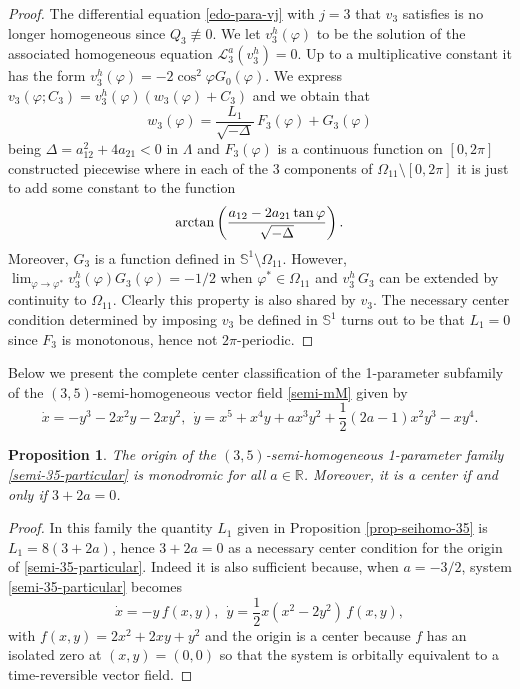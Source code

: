 \documentclass[12pt]{amsart}
\newtheorem {proposition} [theorem]{Proposition}
\begin{document}
\begin{proof}
The differential equation \eqref{edo-para-vj} with $j=3$ that $v_3$ satisfies is no longer homogeneous since $Q_3 \not\equiv 0$. We let $v_3^h(\varphi)$ to be the solution of the associated homogeneous equation $\mathcal{L}^{a}_3(v_3^h) = 0$. Up to a multiplicative constant it has the form $v_3^h(\varphi) = -2 \cos^2\varphi  G_0(\varphi)$. We express $v_3(\varphi; C_3) = v_3^h(\varphi) (w_3(\varphi)+ C_3)$ and we obtain that
$$
w_3(\varphi) = \frac{L_1}{\sqrt{-\Delta}} \, F_3(\varphi) + G_{3}(\varphi)
$$
being $\Delta = a_{12}^2 + 4 a_{21} < 0$ in $\Lambda$ and $F_3(\varphi)$ is a continuous function on $[0, 2 \pi]$ constructed piecewise where in each of the 3 components of $\Omega_{11} \setminus [0, 2 \pi]$ it is just to add some constant to the function
$$
{\rm arctan}\left( \frac{a_{12} -2 a_{21} \tan\varphi}{\sqrt{-\Delta}}\right).
$$
Moreover, $G_{3}$ is a function defined in $\mathbb{S}^1 \setminus \Omega_{11}$. However, $\lim_{\varphi \to \varphi^*} v_3^h(\varphi) G_{3}(\varphi)= -1/2$ when $\varphi^* \in \Omega_{11}$ and $v_3^h \, G_{3}$ can be extended by continuity to $\Omega_{11}$. Clearly this property is also shared by $v_3$. The necessary center condition determined by imposing $v_{3}$ be defined in $\mathbb{S}^1$ turns out to be that $L_1=0$ since $F_3$ is monotonous, hence not $2 \pi$-periodic.
\end{proof}

Below we present the complete center classification of the 1-parameter subfamily of the $(3, 5)$-semi-homogeneous vector field \eqref{semi-mM} given by
\begin{equation}\label{semi-35-particular}
\dot{x} = -y^3 - 2 x^2 y - 2 x y^2, \ \ \dot{y} = x^5 + x^4 y + a x^3 y^2 + \frac{1}{2} (2 a-1) x^2 y^3 - x y^4.
\end{equation}

\begin{proposition}\label{prop-seihomo-35-particular}
The origin of the $(3, 5)$-semi-homogeneous 1-parameter family \eqref{semi-35-particular} is monodromic for all $a \in \mathbb{R}$. Moreover, it is a center if and only if $3 + 2 a=0$.
\end{proposition}
\begin{proof}
In this family the quantity $L_1$ given in Proposition \ref{prop-seihomo-35} is $L_1 = 8 (3 + 2 a)$, hence $3 + 2 a = 0$ as a necessary center condition for the origin of \eqref{semi-35-particular}. Indeed it is also sufficient because, when $a = -3/2$, system \eqref{semi-35-particular} becomes
$$
\dot{x} = -y \, f(x,y), \ \ \dot{y} = \frac{1}{2} x (x^2 - 2 y^2) \, f(x,y),
$$
with $f(x,y)=2 x^2 + 2 x y + y^2$ and the origin is a center because $f$ has an isolated zero at $(x,y)=(0,0)$ so that the system is orbitally equivalent to a time-reversible vector field.
\end{proof}
\end{document}
